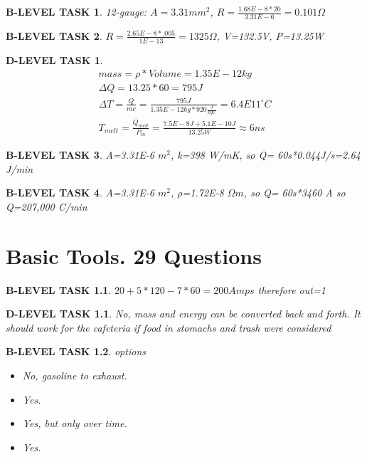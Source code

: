 \documentclass{book}
\numberwithin{equation}{section}
\newtheorem{blevel}{B-LEVEL TASK}
\newtheorem{dlevel}{D-LEVEL TASK}
\theoremstyle{definition}
\begin{document}
\begin{blevel}12-gauge: $A=3.31mm^2$, $R=\frac{1.68E-8*20}{3.31E-6}= 0.101 \Omega$\end{blevel}
\begin{blevel}$R=\frac{2.65E-8*.005}{1E-13}= 1325 \Omega$, V=132.5V, P=13.25W\end{blevel}
\begin{dlevel}
\begin{align*}
mass=\rho*Volume=1.35E-12kg\\
\Delta Q=13.25*60=795J\\
\Delta T=\frac{Q}{mc}=\frac{795J}{1.35E-12kg*920\frac{J}{kgC}}=6.4E11 ^\circ C\\
T_{melt}=\frac{Q_{melt}}{P_{in}}=\frac{7.5E-8J+5.1E-10J}{13.25W}\approx 6ns
\end{align*}
\end{dlevel}
\begin{blevel}A=3.31E-6 $m^2$, k=398 W/mK, so Q= 60s*0.044J/s=2.64 J/min\end{blevel}
\begin{blevel}A=3.31E-6 $m^2$, $\rho$=1.72E-8 $\Omega m$, so Q= 60s*3460 A so Q=207,000 C/min\end{blevel}


\chapter{Basic Tools. 29 Questions}

\begin{blevel}$20+5*120-7*60=200 Amps$ therefore out=1\end{blevel}
\begin{dlevel}No, mass and energy can be converted back and forth. It should work for the cafeteria if food in stomachs and trash were considered\end{dlevel}
\begin{blevel} options
\begin{itemize}
\item No, gasoline to exhaust.
\item Yes.
\item Yes, but only over time.
\item Yes.
\end{itemize}\end{blevel}
\end{document}
